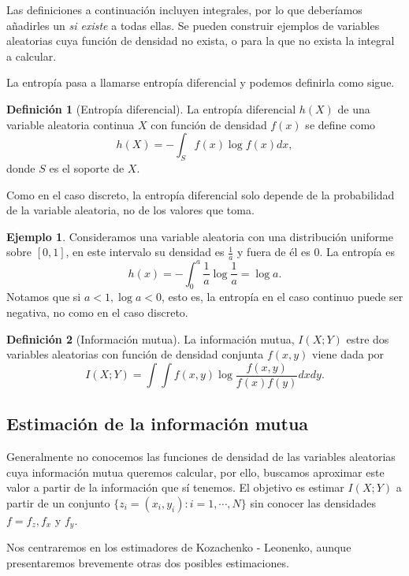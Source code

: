 \documentclass[10pt,a4paper]{article} %
\theoremstyle{definition}
\newtheorem{definition}{Definición}[section]
\newtheorem{example}[theorem]{Ejemplo}
\begin{document}
Las definiciones a continuación incluyen integrales, por lo que deberíamos añadirles un \textit{si existe} a todas ellas. Se pueden construir ejemplos de variables aleatorias cuya función de densidad no exista, o para la que no exista la integral a calcular.

La entropía pasa a llamarse entropía diferencial y podemos definirla como sigue.

\begin{definition}[Entropía diferencial]
  La entropía diferencial $h(X)$ de una variable aleatoria continua $X$ con función de densidad $f(x)$ se define como\[
h(X) = - \int_Sf(x)\log f(x)dx,
\]
donde $S$ es el soporte de $X$.
\end{definition}
Como en el caso discreto, la entropía diferencial solo depende de la probabilidad de la variable aleatoria, no de los valores que toma. 

\begin{example} Consideramos una variable aleatoria con una distribución uniforme sobre $[0,1]$, en este intervalo su densidad es $\frac{1}{a}$ y fuera de él es 0. La entropía es \[
h(x) = - \int_0^a\frac{1}{a}\log\frac{1}{a} = \log a.
  \]
Notamos que si $a<1, \log a < 0$, esto es, la entropía en el caso continuo puede ser negativa, no como en el caso discreto.
  
\end{example}

\begin{definition}[Información mutua]
  La información mutua, $I(X;Y)$ estre dos variables aleatorias con función de densidad conjunta $f(x,y)$ viene dada por\[
I(X;Y) = \int \int f(x,y) \log \frac{f(x,y)}{f(x)f(y)}dxdy.
  \]
\end{definition}

\subsection{Estimación de la información mutua}

Generalmente no conocemos las funciones de densidad de las variables aleatorias cuya información mutua queremos calcular, por ello, buscamos aproximar este valor a partir de la información que sí tenemos. El objetivo es estimar $I(X;Y)$ a partir de un conjunto $\{z_i=(x_i,y_i) : i = 1,\cdots, N\}$ sin conocer las densidades $f=f_z, f_x$ y $f_y$.

Nos centraremos en los estimadores de Kozachenko - Leonenko, aunque presentaremos brevemente otras dos posibles estimaciones.
\end{document}
